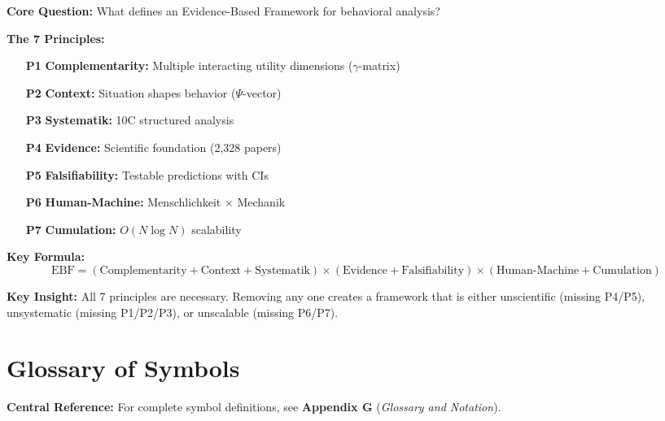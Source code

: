 \begin{tcolorbox}[colback=green!10!white, colframe=green!75!black,
    title=\textbf{Appendix UNMAPPED_PR: Summary}]

\textbf{Core Question:} What defines an Evidence-Based Framework for behavioral analysis?

\textbf{The 7 Principles:}
\begin{enumerate}
    \item[\textbf{P1}] \textbf{Complementarity:} Multiple interacting utility dimensions ($\gamma$-matrix)
    \item[\textbf{P2}] \textbf{Context:} Situation shapes behavior ($\Psi$-vector)
    \item[\textbf{P3}] \textbf{Systematik:} 10C structured analysis
    \item[\textbf{P4}] \textbf{Evidence:} Scientific foundation (2,328 papers)
    \item[\textbf{P5}] \textbf{Falsifiability:} Testable predictions with CIs
    \item[\textbf{P6}] \textbf{Human-Machine:} Menschlichkeit $\times$ Mechanik
    \item[\textbf{P7}] \textbf{Cumulation:} $O(N \log N)$ scalability
\end{enumerate}

\textbf{Key Formula:}
\begin{equation}
\boxed{\text{EBF} = (\text{Complementarity} + \text{Context} + \text{Systematik}) \times (\text{Evidence} + \text{Falsifiability}) \times (\text{Human-Machine} + \text{Cumulation})}
\end{equation}

\textbf{Key Insight:} All 7 principles are necessary. Removing any one creates a framework that is either unscientific (missing P4/P5), unsystematic (missing P1/P2/P3), or unscalable (missing P6/P7).

\end{tcolorbox}


\section{Glossary of Symbols}
\label{sec:pr-glossary}

\begin{tcolorbox}[colback=blue!5!white, colframe=blue!75!black]
\textbf{Central Reference:} For complete symbol definitions, see
\textbf{Appendix G} (\textit{Glossary and Notation}).
\end{tcolorbox}

